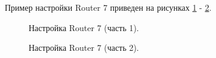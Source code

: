 \documentclass[a4paper,14pt]{article}
\begin{document}
Пример настройки Router 7 приведен на рисунках \ref{fig:r7_1} - \ref{fig:r7_2}.

\newpage
\begin{figure}[!h]
    \caption{Настройка Router 7 (часть 1).}
    \label{fig:r7_1}
\end{figure}

\newpage
\begin{figure}[!h]
    \caption{Настройка Router 7 (часть 2).}
    \label{fig:r7_2}
\end{figure}
\end{document}
